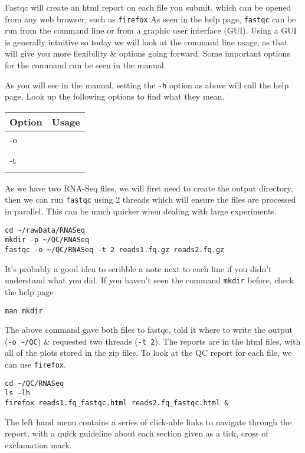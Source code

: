 \begin{note}
Fastqc will create an html report on each file you submit, which can be opened from any web browser, such as \texttt{firefox}
As seen in the help page, \texttt{fastqc} can be run from the command line or from a graphic user interface (GUI).
Using a GUI is generally intuitive so today we will look at the command line usage, as that will give you more flexibility \& options going forward.
Some important options for the command can be seen in the manual.\\
\end{note}
\begin{steps}
As you will see in the manual, setting the \texttt{-h} option as above will call the help page.
Look up the following options to find what they mean. \\
\begin{center}
\begin{tabular}[h]{|p{4cm}|p{8cm}|}
  \hline
  \textbf{Option} & \textbf{Usage} \\
  \hline
  -o & \\
   & \\
   \hline
  -t & \\
   & \\
   \hline
\end{tabular}
\end{center}
\end{steps}

\begin{steps}
As we have two RNA-Seq files, we will first need to create the output directory, then we can run \texttt{fastqc} using 2 threads which will ensure the files are processed in parallel.
This can be much quicker when dealing with large experiments.
\begin{lstlisting}
cd ~/rawData/RNASeq
mkdir -p ~/QC/RNASeq
fastqc -o ~/QC/RNASeq -t 2 reads1.fq.gz reads2.fq.gz
\end{lstlisting}
It's probably a good idea to scribble a note next to each line if you didn't understand what you did.
If you haven't seen the command \texttt{mkdir} before, check the help page 
\begin{lstlisting}
man mkdir
\end{lstlisting}
\end{steps}

\begin{steps}
The above command gave both files to fastqc, told it where to write the output (\texttt{-o \~{}/QC}) \& requested two threads (\texttt{-t 2}). 
The reports are in the html files, with all of the plots stored in the zip files. 
To look at the QC report for each file, we can use \texttt{firefox}.
\begin{lstlisting}
cd ~/QC/RNASeq
ls -lh
firefox reads1.fq_fastqc.html reads2.fq_fastqc.html &
\end{lstlisting}
The left hand menu contains a series of click-able links to navigate through the report, with a quick guideline about each section given as a tick, cross of exclamation mark.
\end{steps}

